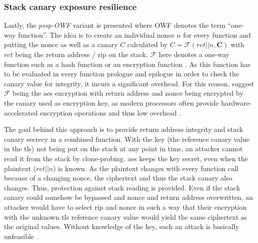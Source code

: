 \subsubsection{Stack canary exposure resilience}
\label{subsubsec:p-ssp-owf}

Lastly, the \emph{\acs{pssp}-OWF} variant is presented where OWF denotes the term ``one-way function''.
The idea is to create an individual nonce $ n $ for every function and putting the nonce as well as a canary $ C $ calculated by $ C = \mathcal{F} \left( ret || n, \textbf{C} \right) $ with $ ret $ being the return address / \gls{rip} on the stack.
$ \mathcal{F} $ here denotes a one-way function such as a hash function or an encryption function \cite[247\psq]{Wang2018}.
As this function has to be evaluated in every function prologue and epilogue in order to check the canary value for integrity, it incurs a significant overhead.
For this reason, \citeauthor{Wang2018} suggest $ \mathcal{F} $ being the \gls{aes} encryption with return address and nonce being encrypted by the canary used as encryption key, as modern processors often provide hardware-accelerated encryption operations and thus low overhead \cite[248,251]{Wang2018}.

The goal behind this approach is to provide return address integrity and stack canary secrecy in a combined function.
With the key (the reference canary value in the \gls{tls}) not being put on the stack at any point in time, an attacker cannot read it from the stack by clone-probing.
\Gls{aes} keeps the key secret, even when the plaintext ($ ret || n $) is known.
As the plaintext changes with every function call because of a changing nonce, the ciphertext and thus the stack canary also changes.
Thus, protection against stack reading is provided.
Even if the stack canary could somehow be bypassed and nonce and return address overwritten, an attacker would have to select \gls{rip} and nonce in such a way that their encryption with the unknown \gls{tls} reference canary value would yield the same ciphertext as the original values.
Without knowledge of the key, such an attack is basically unfeasible \cite[251]{Wang2018}.

